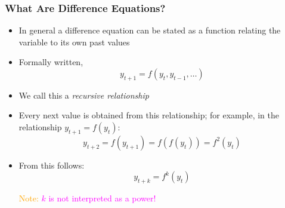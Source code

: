 \documentclass[10pt,usenames,dvipsnames]{beamer}
\theoremstyle{definition}
\begin{document}
%

\begin{frame}[fragile]
	\frametitle{What Are Difference Equations?}
	\begin{itemize}
		\item In general a difference equation can be stated as a function relating the variable to its own past values
		\item Formally written,
		\[
		y_{t+1} = f(y_{t},y_{t-1},\ldots)
		\]
		\item We call this a \emph{recursive relationship}
		\item Every next value is obtained from this relationship; for example, in the relationship $y_{t+1} = f(y_{t})$:
		\[
		y_{t+2} = f(y_{t+1}) = f(f(y_{t})) = f^{2}(y_{t})
		\]
		\item From this follows:
		\[
		y_{t+k} = f^{k}(y_{t})
		\]
		
		\textcolor{orange}{Note: }\textcolor{magenta}{$k$ is not interpreted as a power!}
		
	\end{itemize}
\end{frame}
\end{document}

